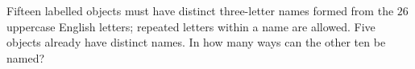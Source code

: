 Fifteen labelled objects must have distinct three-letter names formed from the $26$ uppercase English letters; repeated letters within a name are allowed. Five objects already have distinct names. In how many ways can the other ten be named?
